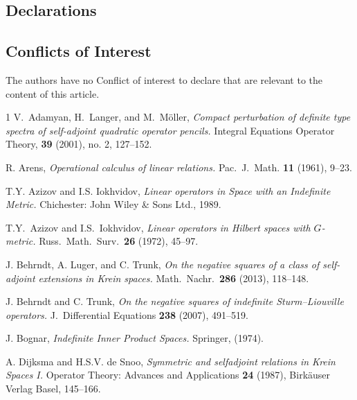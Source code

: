 \documentclass{birkjour}
\theoremstyle{definition}
\theoremstyle{remark}
\numberwithin{equation}{section}
\begin{document}
\subsection*{Declarations}

\subsection*{Conflicts of Interest}
 The authors have no Conflict of interest to declare that
are relevant to the content of this article.

\begin{thebibliography}{1}
 V.\ Adamyan, H.\ Langer, and M.\ M\"{o}ller, \textit{Compact perturbation of definite type spectra of self-adjoint quadratic operator pencils.} Integral Equations Operator Theory, \textbf{39} (2001), no. 2, 127--152.

 R. Arens, \textit{Operational calculus of linear relations.} Pac.\ J.\ Math. \textbf{11} (1961), 9--23.

T.Y. Azizov and I.S. Iokhvidov, \textit{Linear operators in Space with an Indefinite Metric.} Chichester: John Wiley \& Sons Ltd., 1989.

T.Y.\ Azizov and I.S.\ Iokhvidov, \textit{Linear operators in Hilbert spaces with $G$-metric.} Russ.\ Math.\ Surv.\ \textbf{26} (1972), 45--97.

 J. Behrndt, A. Luger, and  C. Trunk, \textit{On the negative squares of a class of self-adjoint extensions in Krein spaces.} Math.\ Nachr.\ \textbf{286} (2013), 118--148.

 J. Behrndt and  C. Trunk,
\textit{On the negative squares of indefinite Sturm–Liouville
operators.} J.\ Differential Equations \textbf{238} (2007), 491–519.


 J. Bognar, \textit{Indefinite Inner Product Spaces.} Springer, (1974).


A. Dijksma and H.S.V. de Snoo,  \textit{Symmetric and selfadjoint relations in Krein Spaces I.} Operator Theory:
Advances and Applications \textbf{24} (1987), Birk\"{a}user Verlag Basel, 145--166.


\end{thebibliography}
\end{document}
